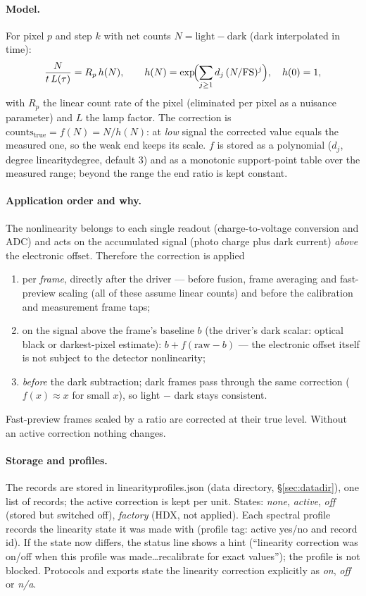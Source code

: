 \documentclass[12pt,a4paper]{article}
\DeclareRobustCommand{\file}[1]{{\ttfamily\small\def\_{\rawus\allowbreak}#1}}
\DeclareRobustCommand{\key}[1]{{\ttfamily\small\color{acc2}\def\_{\rawus\allowbreak}#1}}
\begin{document}
\paragraph{Model.} For pixel $p$ and step $k$ with net counts
$N = \mathrm{light}-\mathrm{dark}$ (dark interpolated in time):
\[
  \frac{N}{t\,L(\tau)} = R_p\,h(N),\qquad
  h(N)=\exp\!\Bigl(\sum_{j\ge1} d_j\,(N/\mathrm{FS})^{j}\Bigr),\quad h(0)=1 ,
\]
with $R_p$ the linear count rate of the pixel (eliminated per pixel as a
nuisance parameter) and $L$ the lamp factor. The correction is
$\mathrm{counts}_{\mathrm{true}} = f(N) = N/h(N)$: at \emph{low} signal the
corrected value equals the measured one, so the weak end keeps its scale. $f$ is
stored as a polynomial ($d_j$, degree \key{linearity\_degree}, default 3) and as a
monotonic support-point table over the measured range; beyond the range the end
ratio is kept constant.

\paragraph{Application order and why.} The nonlinearity belongs to each single
readout (charge-to-voltage conversion and ADC) and acts on the accumulated
signal (photo charge plus dark current) \emph{above} the electronic offset.
Therefore the correction is applied
\begin{enumerate}
  \item per \emph{frame}, directly after the driver --- before fusion, frame
        averaging and fast-preview scaling (all of these assume linear counts)
        and before the calibration and measurement frame taps;
  \item on the signal above the frame's baseline $b$ (the driver's dark scalar:
        optical black or darkest-pixel estimate):
        $b + f(\mathrm{raw}-b)$ --- the electronic offset itself is not subject to
        the detector nonlinearity;
  \item \emph{before} the dark subtraction; dark frames pass through the same
        correction ($f(x)\approx x$ for small $x$), so light $-$ dark stays
        consistent.
\end{enumerate}
Fast-preview frames scaled by a ratio are corrected at their true level.
Without an active correction nothing changes.

\paragraph{Storage and profiles.} The records are stored in
\file{linearity\_profiles.json} (data directory, \S\ref{sec:datadir}), one list
of records; the active correction is kept per unit. States: \emph{none},
\emph{active}, \emph{off} (stored but switched off), \emph{factory} (HDX, not
applied). Each spectral profile records the linearity state it was made with
(profile tag: active yes/no and record id). If the state now differs, the status
line shows a hint (``linearity correction was on/off when this profile was
made\ldots recalibrate for exact values''); the profile is not blocked. Protocols
and exports state the linearity correction explicitly as \emph{on}, \emph{off} or
\emph{n/a}.
\end{document}
